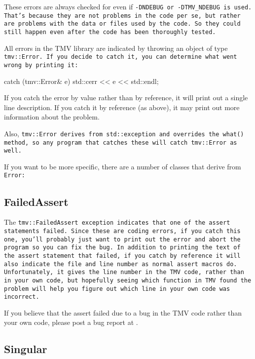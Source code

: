 These errors are always checked for even if \tt{-DNDEBUG} or \tt{-DTMV\_NDEBUG} is used.
That's because they are not problems in the code per se, but rather
are problems with the data or files used by the code.  So they could
still happen even after the code has been thoroughly tested.

All errors in the TMV library are indicated by throwing an object of type
\tt{tmv::Error}.  If you decide to catch it, you can determine what went
wrong by printing it:
\begin{tmvcode}
catch (tmv::Error& e) {
    std::cerr << e << std::endl;
}
\end{tmvcode}
If you catch the error by value rather than by reference, it will print out
a single line description.  If you catch it by reference (as above), it may 
print out more information about the problem.

Also, \tt{tmv::Error} derives from \tt{std::exception} and overrides the \tt{what()}
method, so any program that catches these will catch \tt{tmv::Error} as well.

If you want to be more specific, there are a number of classes that derive from
\tt{Error}:

\subsection{FailedAssert}
\label{FailedAssert}

The \tt{tmv::FailedAssert} exception indicates that one of the assert statements failed.
Since these are coding errors,
if you catch this one, you'll probably just want to print out the error and abort
the program so you can fix the bug.  In addition to printing the text of the
assert statement that failed, if you catch by reference it will also indicate
the file and line number as normal assert macros do.  Unfortunately, it gives the 
line number in the TMV code, rather than in your own code, but hopefully seeing
which function in TMV found the problem will help you figure out which line
in your own code was incorrect.

If you believe that the assert failed due to a bug in the TMV code
rather than your own code, please post a bug report at \myissues.

\subsection{Singular}
\label{Singular}

